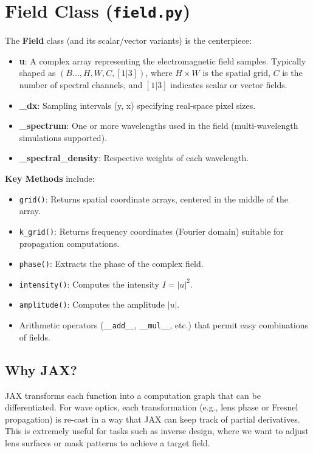\documentclass[a4paper,12pt]{report}
\begin{document}
\section{Field Class (\texttt{field.py})}
The \textbf{Field} class (and its scalar/vector variants) is the centerpiece:
\begin{itemize}
    \item \textbf{u}: A complex array representing the electromagnetic field samples. Typically shaped as $(B..., H, W, C, [1|3])$, where $H\times W$ is the spatial grid, $C$ is the number of spectral channels, and $[1|3]$ indicates scalar or vector fields.
    \item \textbf{\_dx}: Sampling intervals (y, x) specifying real-space pixel sizes.
    \item \textbf{\_spectrum}: One or more wavelengths used in the field (multi-wavelength simulations supported).
    \item \textbf{\_spectral\_density}: Respective weights of each wavelength.
\end{itemize}
\noindent \textbf{Key Methods} include:
\begin{itemize}
    \item \texttt{grid()}: Returns spatial coordinate arrays, centered in the middle of the array.
    \item \texttt{k\_grid()}: Returns frequency coordinates (Fourier domain) suitable for propagation computations.
    \item \texttt{phase()}: Extracts the phase of the complex field.
    \item \texttt{intensity()}: Computes the intensity $I=|u|^2$.
    \item \texttt{amplitude()}: Computes the amplitude $|u|$.
    \item Arithmetic operators (\texttt{\_\_add\_\_}, \texttt{\_\_mul\_\_}, etc.) that permit easy combinations of fields.
\end{itemize}

\subsection{Why JAX?}
JAX transforms each function into a computation graph that can be differentiated. For wave optics, each transformation (e.g., lens phase or Fresnel propagation) is re-cast in a way that JAX can keep track of partial derivatives. This is extremely useful for tasks such as inverse design, where we want to adjust lens surfaces or mask patterns to achieve a target field.
\end{document}
